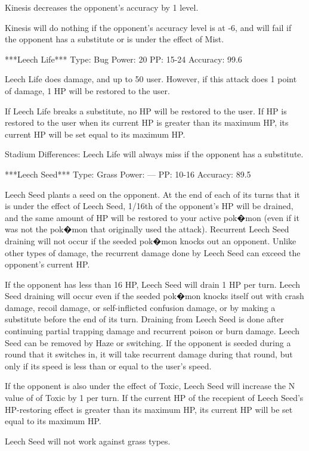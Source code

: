 \documentclass[reprint, aps, prl, paper=A4]{revtex4-1}
\begin{document}
Kinesis decreases the opponent's accuracy by 1 level.

Kinesis will do nothing if the opponent's accuracy level is at -6, and will fail if the
opponent has a substitute or is under the effect of Mist.


***Leech Life***
Type: Bug
Power: 20
PP: 15-24
Accuracy: 99.6%

Leech Life does damage, and up to 50%
user. However, if this attack does 1 point of damage, 1 HP will be restored to the user.

If Leech Life breaks a substitute, no HP will be restored to the user.  If HP is restored to
the user when its current HP is greater than its maximum HP, its current HP will be set equal
to its maximum HP.

Stadium Differences:
Leech Life will always miss if the opponent has a substitute.


***Leech Seed***
Type: Grass
Power: ---
PP: 10-16
Accuracy: 89.5%

Leech Seed plants a seed on the opponent. At the end of each of its turns that it is under the
effect of Leech Seed, 1/16th of the opponent's HP will be drained, and the same amount of HP
will be restored to your active pok�mon (even if it was not the pok�mon that originally used
the attack). Recurrent Leech Seed draining will not occur if the seeded pok�mon knocks out an
opponent. Unlike other types of damage, the recurrent damage done by Leech Seed can exceed the
opponent's current HP.

If the opponent has less than 16 HP, Leech Seed will drain 1 HP per turn. Leech Seed draining
will occur even if the seeded pok�mon knocks itself out with crash damage, recoil damage, or
self-inflicted confusion damage, or by making a substitute before the end of its turn. Draining
from Leech Seed is done after continuing partial trapping damage and recurrent poison or burn
damage. Leech Seed can be removed by Haze or switching. If the opponent is seeded during a
round that it switches in, it will take recurrent damage during that round, but only if its
speed is less than or equal to the user's speed.

If the opponent is also under the effect of Toxic, Leech Seed will increase the N value of
of Toxic by 1 per turn. If the current HP of the recepient of Leech Seed's HP-restoring effect
is greater than its maximum HP, its current HP will be set equal to its maximum HP.

Leech Seed will not work against grass types.
\end{document}
